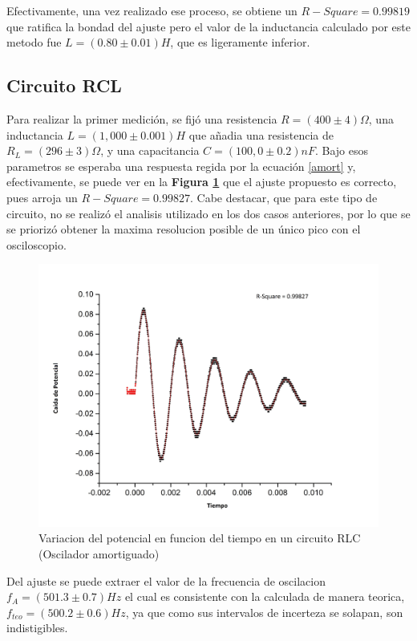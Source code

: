 \documentclass[11pt,a4paper]{article}
\begin{document}
Efectivamente, una vez realizado ese proceso, se obtiene un $R-Square = 0.99819$ que ratifica la bondad del ajuste pero el valor de la inductancia calculado por este metodo fue $L = (0.80 \pm 0.01) H$, que es ligeramente inferior. 


\subsection{Circuito RCL}

Para realizar la primer medición, se fijó una resistencia $R= (400 \pm 4) \Omega$, una inductancia $L = (1,000 \pm 0.001) H$ que añadia una resistencia de $R_{L} = (296 \pm 3) \Omega$, y una capacitancia $C = (100,0 \pm 0.2) nF$. Bajo esos parametros se esperaba una respuesta regida por la ecuación \eqref{amort} y, efectivamente, se puede ver en la \textbf{Figura \ref{fig:RLC-A}} que el ajuste propuesto es correcto, pues arroja un $R-Square = 0.99827$. Cabe destacar, que para este tipo de circuito, no se realizó el analisis utilizado en los dos casos anteriores, por lo que se se priorizó obtener la maxima resolucion posible de un único pico con el osciloscopio.

\begin{figure}[H]
\centering
\includegraphics[scale=0.5]{RLC-Amortiguado(1H)}
  \caption{Variacion del potencial en funcion del tiempo en un circuito RLC (Oscilador amortiguado)}
  \label{fig:RLC-A}
\end{figure}

Del ajuste se puede extraer el valor de la frecuencia de oscilacion $f_{A} = (501.3 \pm 0.7) Hz$ el cual es consistente con la calculada de manera teorica, $f_{teo} = (500.2 \pm 0.6)Hz$, ya que como sus intervalos de incerteza se solapan, son indistigibles.
\end{document}

